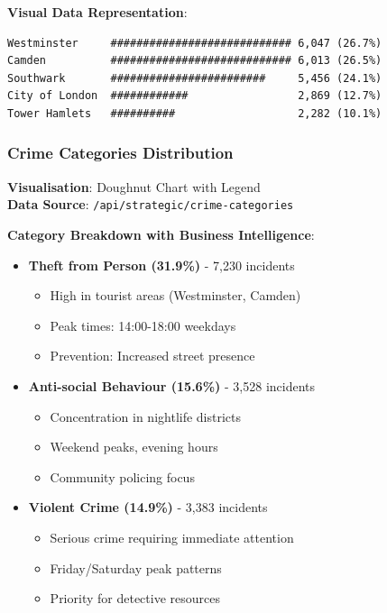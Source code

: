 \documentclass[12pt,a4paper]{article}
\begin{document}
\textbf{Visual Data Representation}:
\begin{verbatim}
Westminster     ############################ 6,047 (26.7%)
Camden          ############################ 6,013 (26.5%)  
Southwark       ########################     5,456 (24.1%)
City of London  ############                 2,869 (12.7%)
Tower Hamlets   ##########                   2,282 (10.1%)
\end{verbatim}

\subsubsection{Crime Categories Distribution}

\textbf{Visualisation}: Doughnut Chart with Legend\\
\textbf{Data Source}: \texttt{/api/strategic/crime-categories}

\textbf{Category Breakdown with Business Intelligence}:
\begin{itemize}
    \item \textbf{Theft from Person (31.9\%)} - 7,230 incidents
    \begin{itemize}
        \item High in tourist areas (Westminster, Camden)
        \item Peak times: 14:00-18:00 weekdays
        \item Prevention: Increased street presence
    \end{itemize}
    \item \textbf{Anti-social Behaviour (15.6\%)} - 3,528 incidents
    \begin{itemize}
        \item Concentration in nightlife districts
        \item Weekend peaks, evening hours
        \item Community policing focus
    \end{itemize}
    \item \textbf{Violent Crime (14.9\%)} - 3,383 incidents
    \begin{itemize}
        \item Serious crime requiring immediate attention
        \item Friday/Saturday peak patterns
        \item Priority for detective resources
    \end{itemize}
\end{itemize}
\end{document}
